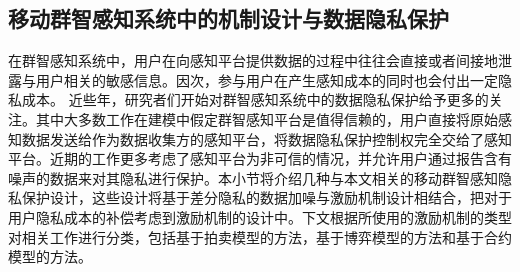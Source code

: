 \subsection{移动群智感知系统中的机制设计与数据隐私保护}
在群智感知系统中，用户在向感知平台提供数据的过程中往往会直接或者间接地泄露与用户相关的敏感信息。因次，参与用户在产生感知成本的同时也会付出一定隐私成本。
近些年，研究者们开始对群智感知系统中的数据隐私保护给予更多的关注\cite{christin2011survey,dandekar2014privacy,ghosh2015selling,jin2016inception,zhang2016privacy,wang2016value,gong2017truthful}。其中大多数工作\cite{christin2011survey,dandekar2014privacy,ghosh2015selling,jin2016inception,zhang2016privacy}在建模中假定群智感知平台是值得信赖的，用户直接将原始感知数据发送给作为数据收集方的感知平台，将数据隐私保护控制权完全交给了感知平台。近期的工作\cite{wang2016value,wang2016buying}更多考虑了感知平台为非可信的情况，并允许用户通过报告含有噪声的数据来对其隐私进行保护。本小节将介绍几种与本文相关的移动群智感知隐私保护设计，这些设计将基于差分隐私的数据加噪与激励机制设计相结合，把对于用户隐私成本的补偿考虑到激励机制的设计中。下文根据所使用的激励机制的类型对相关工作进行分类，包括基于{\kaishu 拍卖模型}的方法，基于{\kaishu 博弈模型}的方法和基于{\kaishu 合约模型}的方法。







